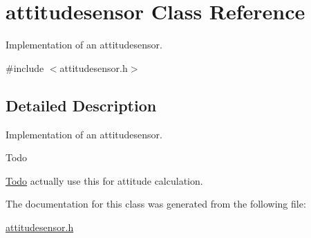 \hypertarget{classattitudesensor}{}\section{attitudesensor Class Reference}
\label{classattitudesensor}


Implementation of an attitudesensor.  




{\ttfamily \#include $<$attitudesensor.\+h$>$}



\subsection{Detailed Description}
Implementation of an attitudesensor. 

\begin{DoxyRefDesc}{Todo}
\item[\hyperlink{todo__todo000001}{Todo}]actually use this for attitude calculation. \end{DoxyRefDesc}


The documentation for this class was generated from the following file\+:\begin{DoxyCompactItemize}
\item 
\hyperlink{attitudesensor_8h}{attitudesensor.\+h}\end{DoxyCompactItemize}
